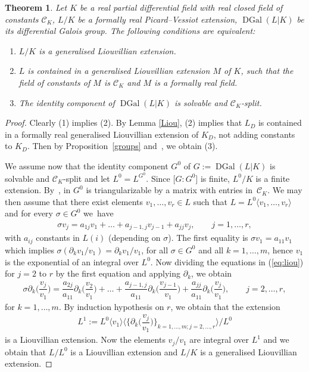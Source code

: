 \documentclass[pdftex]{sigma}%
\numberwithin{equation}{section}
\newtheorem{Theorem}{Theorem}[section]
\def \DGal{\operatorname{DGal}}
\begin{document}
\begin{Theorem}\label{genL}
Let $K$ be a real partial differential field with real closed field of constants $\mathcal{C}_K$, $L/K$ be a formally real Picard--Vessiot extension, $\DGal(L|K)$ be its differential Galois group. The following conditions are equivalent:
\begin{enumerate}\itemsep=0pt
\item[$1.$] $L/K$ is a generalised Liouvillian extension.
\item[$2.$] $L$ is contained in a generalised Liouvillian extension $M$ of $K$, such that the field of constants of $M$ is $\mathcal{C}_K$ and $M$ is a formally real field.
\item[$3.$] The identity component of $\DGal(L|K)$ is solvable and $\mathcal{C}_K$-split.
\end{enumerate}
\end{Theorem}

\begin{proof} Clearly (1) implies (2). By Lemma \ref{Liou}, (2) implies that $L_D$ is contained in a formally real generalised Liouvillian extension of $K_D$, not adding constants to $K_D$. Then by Proposition~\ref{groups} and~\cite[Theorem~18]{CH}, we obtain (3).

We assume now that the identity component $G^0$ of $G:=\DGal(L|K)$ is solvable and $\mathcal{C}_K$-split and let $L^0=L^{G^0}$. Since $\big[G:G^0\big]$ is finite, $L^0/K$ is a finite extension. By~\cite[Chapter~V, Theorem~15.4]{B}, in $G^0$ is triangularizable by a matrix with entries in~$\mathcal{C}_K$. We may then assume that there exist elements
$v_1,\dots,v_r \in L$ such that $L=L^0\langle v_1,\dots,v_r \rangle$ and for every $\sigma \in G^0$ we~have
\begin{gather}\label{eq:liou}
\sigma v_j = a_{1j} v_1 + \dots + a_{j-1,j} v_{j-1}+a_{jj} v_j , \qquad j=1,\dots,r,
\end{gather}
with $a_{ij}$ constants in $L(i)$ (depending on $\sigma$). The first equality is $\sigma v_1=a_{11} v_1$ which implies $\sigma(\partial_k v_1/v_1)=\partial_k v_1/v_1$, for all $\sigma \in G^0$ and all $k=1,\dots,m$, hence $v_1$ is the exponential of an integral over $L^0$. Now dividing the equations in (\ref{eq:liou}) for $j=2$ to $r$ by the first equation and applying $\partial_k$, we obtain
\begin{gather*}
\sigma \partial_k \bigg(\dfrac {v_j}{v_1}\bigg)
= \dfrac {a_{2j}}{a_{11}} \partial_k \bigg(\dfrac{v_2}{v_1} \bigg)+ \dots + \dfrac {a_{j-1,j}}{a_{11}} \partial_k \bigg(\dfrac{ v_{j-1}}{v_1} \bigg)+
\dfrac{a_{jj}}{a_{11}} \partial_k \bigg(\dfrac{ v_j}{v_1} \bigg), \qquad j=2,\dots,r,
\end{gather*}
for $k=1,\dots,m$. By induction hypothesis on $r$, we obtain that the extension
\begin{gather*}
L^1:=L^0\langle v_1 \rangle \bigg\langle \bigg\{\partial_k \bigg(\dfrac {v_j}{v_1}\bigg)\bigg\}_{k=1,\dots,m; j=2,\dots,r}\bigg\rangle\Big/L^0
\end{gather*}
is a Liouvillian extension. Now the elements $v_j/v_1$ are integral over $L^1$ and we obtain that $L/L^0$ is a Liouvillian extension and $L/K$ is a generalised Liouvillian extension.
\end{proof}
\end{document}
